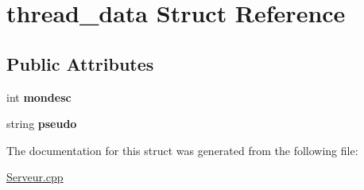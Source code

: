 \hypertarget{structthread__data}{\section{thread\-\_\-data \-Struct \-Reference}
\label{structthread__data}
}
\subsection*{\-Public \-Attributes}
\begin{DoxyCompactItemize}
\item 
\hypertarget{structthread__data_aa2a4c9277a3ef6de228eba6e78dbc4ab}{int {\bfseries mondesc}}\label{structthread__data_aa2a4c9277a3ef6de228eba6e78dbc4ab}

\item 
\hypertarget{structthread__data_affe70da9a434125d207b360dc6515bf5}{string {\bfseries pseudo}}\label{structthread__data_affe70da9a434125d207b360dc6515bf5}

\end{DoxyCompactItemize}


\-The documentation for this struct was generated from the following file\-:\begin{DoxyCompactItemize}
\item 
\hyperlink{_serveur_8cpp}{\-Serveur.\-cpp}\end{DoxyCompactItemize}
